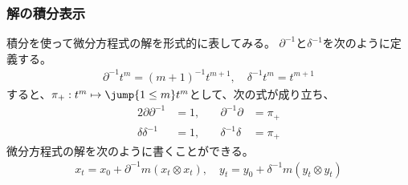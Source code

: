 {\subsubsection{解の積分表示}\label{s3:解の積分表示} %
	積分を使って微分方程式の解を形式的に表してみる。
	$\partial^{-1}$と$\delta^{-1}$を次のように定義する。
	\begin{equation*}\begin{split}
		\partial^{-1}t^m = (m+1)^{-1}t^{m+1},\quad \delta^{-1}t^m = t^{m+1}
	\end{split}\end{equation*}
	すると、$\pi_+:t^m\mapsto\jump{1\le m}t^m$として、次の式が成り立ち、
	\begin{alignat*}{2}
		\partial\partial^{-1} &= 1, &\quad \partial^{-1}\partial &= \pi_+ \\
		\delta\delta^{-1} &= 1, &\quad \delta^{-1}\delta &= \pi_+
	\end{alignat*}
	微分方程式の解を次のように書くことができる。
	\begin{equation*}\begin{split}
		x_t = x_0 + \partial^{-1} m(x_t\otimes x_t),\quad
		y_t = y_0 + \delta^{-1} m(y_t\otimes y_t)
	\end{split}\end{equation*}

}

